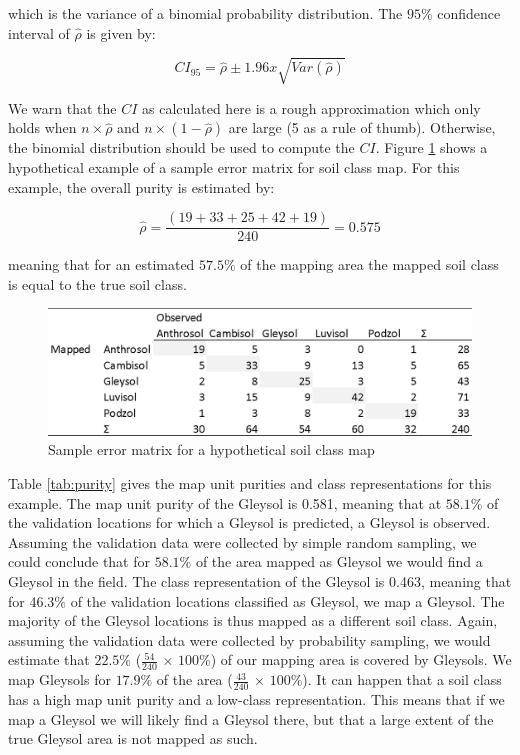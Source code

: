 \documentclass[10pt,b5paper,]{book}
\theoremstyle{definition}
\theoremstyle{definition}
\theoremstyle{definition}
\theoremstyle{remark}
\begin{document}
which is the variance of a binomial probability distribution. The
\(95\%\) confidence interval of \(\hat{\rho}\) is given by:

\begin{equation}
CI_{95} = \hat{\rho} \pm 1.96x \sqrt{Var(\hat{\rho})}
\end{equation}

We warn that the \(CI\) as calculated here is a rough approximation
which only holds when \(n \times \hat{\rho}\) and
\(n \times (1 - \hat{\rho})\) are large (5 as a rule of thumb).
Otherwise, the binomial distribution should be used to compute the
\(CI\). Figure \ref{fig:errormatrix2} shows a hypothetical example of a
sample error matrix for soil class map. For this example, the overall
purity is estimated by:

\begin{equation}
\hat{\rho} = \frac{(19 + 33 + 25 + 42 + 19)}{240} = 0.575
\end{equation}

meaning that for an estimated \(57.5\%\) of the mapping area the mapped
soil class is equal to the true soil class.

\begin{figure}

{\centering \includegraphics[width=0.8\linewidth]{images/Validation_error_matrix2} 

}

\caption{Sample error matrix for a hypothetical soil class map}\label{fig:errormatrix2}
\end{figure}

Table \ref{tab:purity} gives the map unit purities and class
representations for this example. The map unit purity of the Gleysol is
0.581, meaning that at \(58.1\%\) of the validation locations for which
a Gleysol is predicted, a Gleysol is observed. Assuming the validation
data were collected by simple random sampling, we could conclude that
for \(58.1\%\) of the area mapped as Gleysol we would find a Gleysol in
the field. The class representation of the Gleysol is 0.463, meaning
that for \(46.3\%\) of the validation locations classified as Gleysol,
we map a Gleysol. The majority of the Gleysol locations is thus mapped
as a different soil class. Again, assuming the validation data were
collected by probability sampling, we would estimate that \(22.5\%\)
(\(\frac{54}{240}\) \(\times\) \(100\%\)) of our mapping area is covered
by Gleysols. We map Gleysols for \(17.9\%\) of the area
(\(\frac{43}{240}\) \(\times\) \(100\%\)). It can happen that a soil
class has a high map unit purity and a low-class representation. This
means that if we map a Gleysol we will likely find a Gleysol there, but
that a large extent of the true Gleysol area is not mapped as such.
\end{document}
